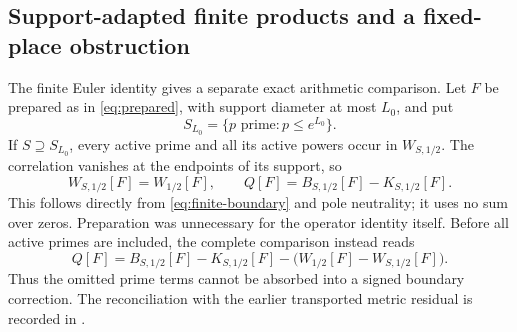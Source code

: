 \documentclass[11pt]{article}
\numberwithin{equation}{section}
\theoremstyle{definition}
\theoremstyle{remark}
\begin{document}
\subsection{Support-adapted finite products and a fixed-place obstruction}
\label{sec:finite-comparison}

The finite Euler identity gives a separate exact arithmetic comparison.
Let \(F\) be prepared as in \eqref{eq:prepared}, with support diameter
at most \(L_0\), and put
\[
S_{L_0}=\{p\text{ prime}:p\le e^{L_0}\}.
\]
If \(S\supseteq S_{L_0}\), every active prime and all its active
powers occur in \(W_{S,1/2}\). The correlation vanishes at the
endpoints of its support, so
\begin{equation}\label{eq:finite-comparison}
W_{S,1/2}[F]=W_{1/2}[F],\qquad
Q[F]=B_{S,1/2}[F]-K_{S,1/2}[F].
\end{equation}
This follows directly from \eqref{eq:finite-boundary} and pole
neutrality; it uses no sum over zeros. Preparation was unnecessary
for the operator identity itself. Before all active primes are
included, the complete comparison instead reads
\[
Q[F]=B_{S,1/2}[F]-K_{S,1/2}[F]
-\bigl(W_{1/2}[F]-W_{S,1/2}[F]\bigr).
\]
Thus the omitted prime terms cannot be absorbed into a signed
boundary correction. The reconciliation with the earlier transported
metric residual is recorded in \cite[Section 5]{FiniteEulerNote}.
\end{document}
